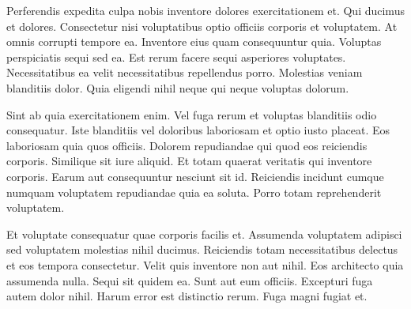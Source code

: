 Perferendis expedita culpa nobis inventore dolores exercitationem et. Qui ducimus et dolores. Consectetur nisi voluptatibus optio officiis corporis et voluptatem. At omnis corrupti tempore ea. Inventore eius quam consequuntur quia. Voluptas perspiciatis sequi sed ea. Est rerum facere sequi asperiores voluptates. Necessitatibus ea velit necessitatibus repellendus porro. Molestias veniam blanditiis dolor. Quia eligendi nihil neque qui neque voluptas dolorum.

Sint ab quia exercitationem enim. Vel fuga rerum et voluptas blanditiis odio consequatur. Iste blanditiis vel doloribus laboriosam et optio iusto placeat. Eos laboriosam quia quos officiis. Dolorem repudiandae qui quod eos reiciendis corporis. Similique sit iure aliquid. Et totam quaerat veritatis qui inventore corporis. Earum aut consequuntur nesciunt sit id. Reiciendis incidunt cumque numquam voluptatem repudiandae quia ea soluta. Porro totam reprehenderit voluptatem.

Et voluptate consequatur quae corporis facilis et. Assumenda voluptatem adipisci sed voluptatem molestias nihil ducimus. Reiciendis totam necessitatibus delectus et eos tempora consectetur. Velit quis inventore non aut nihil. Eos architecto quia assumenda nulla. Sequi sit quidem ea. Sunt aut eum officiis. Excepturi fuga autem dolor nihil. Harum error est distinctio rerum. Fuga magni fugiat et.
